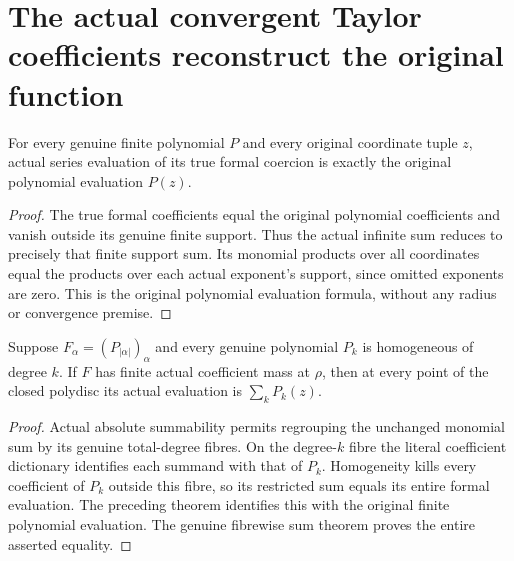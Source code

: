 \section{The actual convergent Taylor coefficients reconstruct the original function}

\begin{theorem}
\label{hir:actual-taylor-polynomial-evaluation}
\leanok
For every genuine finite polynomial $P$ and every original coordinate
tuple $z$, actual series evaluation of its true formal coercion is
exactly the original polynomial evaluation $P(z)$.
\end{theorem}
\begin{proof}
The true formal coefficients equal the original polynomial coefficients
and vanish outside its genuine finite support. Thus the actual infinite
sum reduces to precisely that finite support sum. Its monomial products
over all coordinates equal the products over each actual exponent's
support, since omitted exponents are zero. This is the original
polynomial evaluation formula, without any radius or convergence premise.
\end{proof}

\begin{theorem}
\label{hir:actual-taylor-homogeneous-evaluation-regrouping}
\leanok
Suppose $F_\alpha=(P_{|\alpha|})_\alpha$ and every genuine polynomial
$P_k$ is homogeneous of degree $k$. If $F$ has finite actual coefficient
mass at $\rho$, then at every point of the closed polydisc its actual
evaluation is $\sum_k P_k(z)$.
\end{theorem}
\begin{proof}
Actual absolute summability permits regrouping the unchanged monomial
sum by its genuine total-degree fibres. On the degree-$k$ fibre the
literal coefficient dictionary identifies each summand with that of
$P_k$. Homogeneity kills every coefficient of $P_k$ outside this
fibre, so its restricted sum equals its entire formal evaluation.
The preceding theorem identifies this with the original finite
polynomial evaluation. The genuine fibrewise sum theorem proves
the entire asserted equality.
\end{proof}

